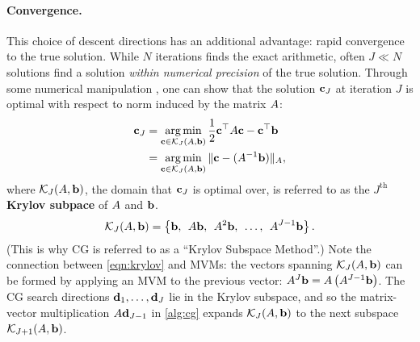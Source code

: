 

\paragraph{Convergence.}
This choice of descent directions has an additional advantage: rapid convergence to the true solution.
While $N$ iterations finds the exact arithmetic, often $J \ll N$ solutions find a solution \emph{within numerical precision} of the true solution.
Through some numerical manipulation \citep[see][]{golub2012matrix}, one can show that the solution $\mathbf{c}_J$ at iteration $J$ is optimal with respect to norm induced by the matrix $A$:
%
\begin{align}
  \mathbf{c}_J
  &= \operatorname*{arg\,min}_{\mathbf{c} \in \mathcal{K}_J (A, \mathbf{b})} \frac{1}{2} \mathbf{c}^\top A \mathbf{c} - \mathbf{c}^\top \mathbf{b}
  \nonumber \\
  &= \operatorname*{arg\,min}_{\mathbf{c} \in \mathcal{K}_J (A, \mathbf{b})} \Vert \mathbf{c} - (A^{-1} \mathbf{b}) \Vert_{A},
  \label{eqn:cg_optimality}
\end{align}
%
where $\mathcal{K}_J (A, \mathbf{b})$, the domain that $\mathbf{c}_J$ is optimal over, is referred to as the $J^\text{th}$ {\bf Krylov subpace} of $A$ and $\mathbf{b}$.
%
\begin{equation}
  \mathcal{K}_J (A, \mathbf{b}) = \left\{ \mathbf{b}, \:\: A \mathbf{b}, \:\: A^2 \mathbf{b}, \:\: \ldots, \:\: A^{J-1} \mathbf{b} \right\}.
  \label{eqn:krylov}
\end{equation}
%
(This is why CG is referred to as a ``Krylov Subspace Method''.)
Note the connection between \cref{eqn:krylov} and MVMs:
the vectors spanning $\mathcal{K}_J (A, \mathbf{b})$ can be formed by applying an MVM to the previous vector: $A^J \mathbf{b} = A \left( A^{J-1} \mathbf{b} \right)$.
The CG search directions $\mathbf{d}_1, \ldots, \mathbf{d}_J$ lie in the Krylov subspace, and so the matrix-vector multiplication $A \mathbf{d}_{J-1}$ in \cref{alg:cg} expands $\mathcal{K}_{J}(A, \mathbf{b})$ to the next subspace $\mathcal{K}_{J+1} (A, \mathbf{b})$.

